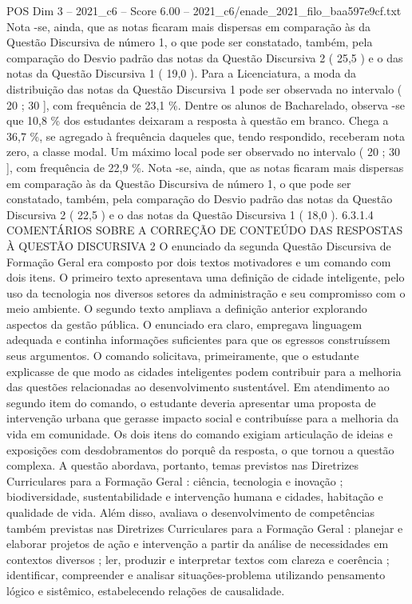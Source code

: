 \begin{textsample}{POS Dim 3 – 2021\_c6 – Score 6.00 – 2021\_c6/enade\_2021\_filo\_baa597e9cf.txt}
Nota -se, ainda, que as notas ficaram mais dispersas em comparação às da Questão Discursiva de número 1, o que pode ser constatado, também, pela comparação do Desvio padrão das notas da Questão Discursiva 2 ( 25,5 ) e o das notas da Questão Discursiva 1 ( 19,0 ).
Para a Licenciatura, a moda da distribuição das notas da Questão Discursiva 1 pode ser observada no intervalo ( 20 ; 30 ], com frequência de 23,1 \%.
Dentre os alunos de Bacharelado, observa -se que 10,8 \% dos estudantes deixaram a resposta à questão em branco.
Chega a 36,7 \%, se agregado à frequência daqueles que, tendo respondido, receberam nota zero, a classe modal.
Um máximo local pode ser observado no intervalo ( 20 ; 30 ], com frequência de 22,9 \%.
Nota -se, ainda, que as notas ficaram mais dispersas em comparação às da Questão Discursiva de número 1, o que pode ser constatado, também, pela comparação do Desvio padrão das notas da Questão Discursiva 2 ( 22,5 ) e o das notas da Questão Discursiva 1 ( 18,0 ). 6.3.1.4 COMENTÁRIOS SOBRE A CORREÇÃO DE CONTEÚDO DAS RESPOSTAS À QUESTÃO DISCURSIVA 2 O enunciado da segunda Questão Discursiva de Formação Geral era composto por dois textos motivadores e um comando com dois itens.
O primeiro texto apresentava uma definição de cidade inteligente, pelo uso da tecnologia nos diversos setores da administração e seu compromisso com o meio ambiente.
O segundo texto ampliava a definição anterior explorando aspectos da gestão pública.
O enunciado era claro, empregava linguagem adequada e continha informações suficientes para que os egressos construíssem seus argumentos.
O comando solicitava, primeiramente, que o estudante explicasse de que modo as cidades inteligentes podem contribuir para a melhoria das questões relacionadas ao desenvolvimento sustentável.
Em atendimento ao segundo item do comando, o estudante deveria apresentar uma proposta de intervenção urbana que gerasse impacto social e contribuísse para a melhoria da vida em comunidade.
Os dois itens do comando exigiam articulação de ideias e exposições com desdobramentos do porquê da resposta, o que tornou a questão complexa.
A questão abordava, portanto, temas previstos nas Diretrizes Curriculares para a Formação Geral : ciência, tecnologia e inovação ; biodiversidade, sustentabilidade e intervenção humana e cidades, habitação e qualidade de vida.
Além disso, avaliava o desenvolvimento de competências também previstas nas Diretrizes Curriculares para a Formação Geral : planejar e elaborar projetos de ação e intervenção a partir da análise de necessidades em contextos diversos ; ler, produzir e interpretar textos com clareza e coerência ; identificar, compreender e analisar situações-problema utilizando pensamento lógico e sistêmico, estabelecendo relações de causalidade.

\end{textsample}
